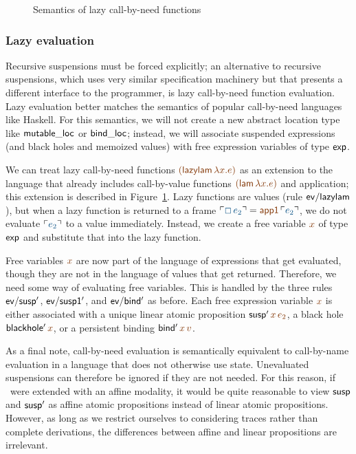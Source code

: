 \begin{figure}
\caption{Semantics of lazy call-by-need functions}
\label{fig:ssos-by-need}
\end{figure}

\subsubsection{Lazy evaluation}

Recursive suspensions must be forced explicitly; an alternative to
recursive suspensions, which uses very similar specification machinery
but that presents a different interface to the programmer, is
lazy call-by-need function evaluation. Lazy evaluation better matches
the semantics of popular call-by-need languages like Haskell. For this
semantics, we will not create a new abstract location type like ${\sf
  mutable\_loc}$ or ${\sf bind\_loc}$; instead, we will associate
suspended expressions (and black holes and memoized values) with free
expression variables of type ${\sf exp}$.

We can treat lazy call-by-need functions $\lf{({\sf lazylam}\,\lambda
  x.e)}$ as an extension to the language that already includes
call-by-value functions $\lf{({\sf lam}\,\lambda x.e)}$ and
application; this extension is described in
Figure~\ref{fig:ssos-by-need}. Lazy functions are values (rule ${\sf
  ev/lazylam}$), but when a lazy function is returned to a frame
$\interp{\Box\,e_2} = \lf{{\sf app1}\,\interp{e_2}}$, we do not
evaluate $\interp{e_2}$ to a value immediately. Instead, we create a
free variable $\lf{x}$ of type ${\sf exp}$ and substitute that into
the lazy function.

Free variables $\lf{x}$ are now part of the language of expressions that
get evaluated, though they are not in the language of values that get
returned. Therefore, we need some way of evaluating free
variables. This is handled by the three rules ${\sf ev/susp'}$, ${\sf
  ev/susp1'}$, and ${\sf ev/bind'}$ as before. Each free expression
variable $\lf{x}$ is either associated with a unique linear atomic
proposition ${\sf susp'}\,\lf{x}\,\lf{e_2}$, a black hole 
${\sf blackhole'}\,\lf{x}$,
or a persistent binding ${\sf bind'}\,\lf{x}\,\lf{v}$.

As a final note, call-by-need evaluation is semantically equivalent to
call-by-name evaluation in a language that does not otherwise use
state. Unevaluated suspensions can therefore be ignored if they are
not needed. For this reason, if \sls~were extended with an affine
modality, it would be quite reasonable to view ${\sf susp}$ and ${\sf
  susp'}$ as affine atomic propositions instead of linear atomic
propositions. However, as long as we
restrict ourselves to considering traces rather than complete
derivations, the differences between affine and linear propositions
are irrelevant.

